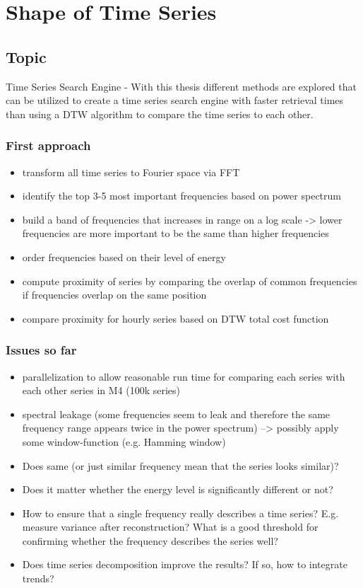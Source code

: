 \documentclass[11pt]{article}
\author{Philipp Beer}
\date{\today}
\title{}
\begin{document}
\tableofcontents

\section{Shape of Time Series}
\label{sec:org03860a5}
\subsection{Topic}
\label{sec:orge54e2d5}
Time Series Search Engine - With this thesis different methods are explored that can be utilized to create a time series search engine with faster retrieval times than using a DTW algorithm to compare the time series to each other.

\subsubsection{First approach}
\label{sec:org89f0aaf}
\begin{itemize}
\item transform all time series to Fourier space via FFT
\item identify the top 3-5 most important frequencies based on power spectrum
\item build a band of frequencies that increases in range on a log scale -> lower frequencies are more important to be the same than higher frequencies
\item order frequencies based on their level of energy
\item compute proximity of series by comparing the overlap of common frequencies if frequencies overlap on the same position
\item compare proximity for hourly series based on DTW total cost function
\end{itemize}

\subsubsection{Issues so far}
\label{sec:orgf514510}
\begin{itemize}
\item parallelization to allow reasonable run time for comparing each series with each other series in M4 (100k series)
\item spectral leakage (some frequencies seem to leak and therefore the same frequency range appears twice in the power spectrum) --> possibly apply some window-function (e.g. Hamming window)
\item Does same (or just similar frequency mean that the series looks similar)?
\item Does it matter whether the energy level is significantly different or not?
\item How to ensure that a single frequency really describes a time series? E.g. measure variance after reconstruction? What is a good threshold for confirming whether the frequency describes the series well?
\item Does time series decomposition improve the results? If so, how to integrate trends?
\end{itemize}
\end{document}
